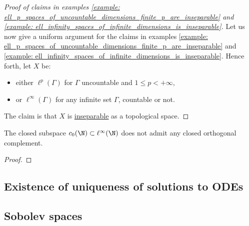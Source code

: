         \begin{proof}[Proof of claims in examples \ref{example: ell_p_spaces_of_uncountable_dimensions_finite_p_are_inseparable} and \ref{example: ell_infinity_spaces_of_infinite_dimensions_is_inseparable}]
            Let us now give a uniform argument for the claims in examples \ref{example: ell_p_spaces_of_uncountable_dimensions_finite_p_are_inseparable} and \ref{example: ell_infinity_spaces_of_infinite_dimensions_is_inseparable}. Hence forth, let $X$ be:
            \begin{itemize}
                \item either $\ell^p(\Gamma)$ for $\Gamma$ uncountable and $1 \leq p < +\infty$,
                \item or $\ell^{\infty}(\Gamma)$ for any infinite set $\Gamma$, countable or not.
            \end{itemize}
            The claim is that $X$ is \underline{inseparable} as a topological space.

        \end{proof}

        \begin{proposition}
            The closed subspace $c_0(\N) \subset \ell^{\infty}(\N)$ does not admit any closed orthogonal complement.
        \end{proposition}
            \begin{proof}
                
            \end{proof}

    \subsection{Existence of uniqueness of solutions to ODEs}

    \subsection{Sobolev spaces} \label{subsection: sobolev_spaces}